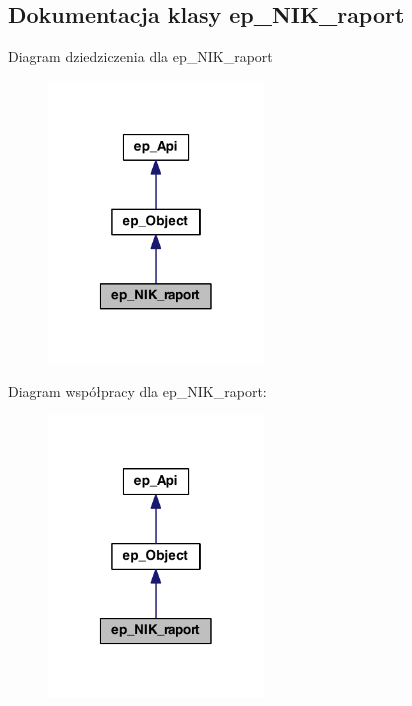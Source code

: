 \hypertarget{classep___n_i_k__raport}{\subsection{Dokumentacja klasy ep\-\_\-\-N\-I\-K\-\_\-raport}
\label{classep___n_i_k__raport}
}


Diagram dziedziczenia dla ep\-\_\-\-N\-I\-K\-\_\-raport\nopagebreak
\begin{figure}[H]
\begin{center}
\leavevmode
\includegraphics[width=162pt]{classep___n_i_k__raport__inherit__graph}
\end{center}
\end{figure}


Diagram współpracy dla ep\-\_\-\-N\-I\-K\-\_\-raport\-:\nopagebreak
\begin{figure}[H]
\begin{center}
\leavevmode
\includegraphics[width=162pt]{classep___n_i_k__raport__coll__graph}
\end{center}
\end{figure}
